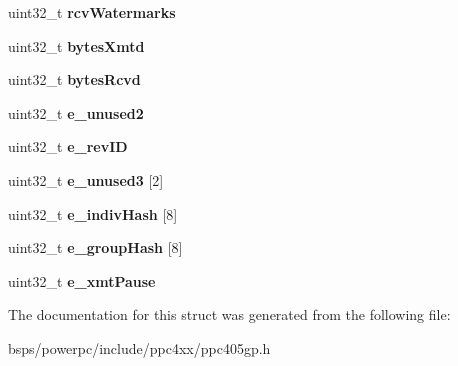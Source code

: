 \begin{DoxyCompactItemize}
uint32\+\_\+t {\bfseries rcv\+Watermarks}
\item 
\mbox{\label{structEthernetRegisters__GP_a8f3846467022d0024078772820dca9a1}} 
uint32\+\_\+t {\bfseries bytes\+Xmtd}
\item 
\mbox{\label{structEthernetRegisters__GP_a13e025c7e4bd83199afcf39b83817f5a}} 
uint32\+\_\+t {\bfseries bytes\+Rcvd}
\item 
\mbox{\label{structEthernetRegisters__GP_a949e1f140f16087eb2090ba11135d7e7}} 
uint32\+\_\+t {\bfseries e\+\_\+unused2}
\item 
\mbox{\label{structEthernetRegisters__GP_a7bc0ba6aa68be8ee9f44817824472919}} 
uint32\+\_\+t {\bfseries e\+\_\+rev\+ID}
\item 
\mbox{\label{structEthernetRegisters__GP_a0c8c6a80a511163b76d81d4d157839fe}} 
uint32\+\_\+t {\bfseries e\+\_\+unused3} \mbox{[}2\mbox{]}
\item 
\mbox{\label{structEthernetRegisters__GP_aaabfde8264cc22b4467e1dab8a4bb3fc}} 
uint32\+\_\+t {\bfseries e\+\_\+indiv\+Hash} \mbox{[}8\mbox{]}
\item 
\mbox{\label{structEthernetRegisters__GP_a891355b24272bad93ed2462e9f30f4f9}} 
uint32\+\_\+t {\bfseries e\+\_\+group\+Hash} \mbox{[}8\mbox{]}
\item 
\mbox{\label{structEthernetRegisters__GP_a5eeeac89d369135d1e44d8f1bc38a2e8}} 
uint32\+\_\+t {\bfseries e\+\_\+xmt\+Pause}
\end{DoxyCompactItemize}


The documentation for this struct was generated from the following file\+:\begin{DoxyCompactItemize}
\item 
bsps/powerpc/include/ppc4xx/ppc405gp.\+h\end{DoxyCompactItemize}
